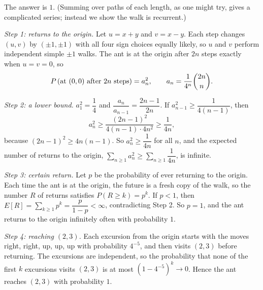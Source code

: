 The answer is $\boxed{1}$. (Summing over paths of each length, as one might try, gives a complicated series; instead we show the walk is recurrent.)

\emph{Step 1: returns to the origin.} Let $u=x+y$ and $v=x-y$. Each step changes $(u,v)$ by $(\pm1,\pm1)$ with all four sign choices equally likely, so $u$ and $v$ perform independent simple $\pm1$ walks. The ant is at the origin after $2n$ steps exactly when $u=v=0$, so
\[P\left(\text{at }(0,0)\text{ after }2n\text{ steps}\right)=a_n^2,\qquad a_n=\dfrac{1}{4^n}\dbinom{2n}{n}.\]

\emph{Step 2: a lower bound.} $a_1^2=\dfrac14$ and $\dfrac{a_n}{a_{n-1}}=\dfrac{2n-1}{2n}$. If $a_{n-1}^2\ge\dfrac{1}{4(n-1)}$, then
\[a_n^2\ge\dfrac{(2n-1)^2}{4(n-1)\cdot4n^2}\ge\dfrac1{4n},\]
because $(2n-1)^2\ge4n(n-1)$. So $a_n^2\ge\dfrac1{4n}$ for all $n$, and the expected number of returns to the origin, $\displaystyle\sum_{n\ge1}a_n^2\ge\sum_{n\ge1}\dfrac{1}{4n}$, is infinite.

\emph{Step 3: certain return.} Let $p$ be the probability of ever returning to the origin. Each time the ant is at the origin, the future is a fresh copy of the walk, so the number $R$ of returns satisfies $P(R\ge k)=p^k$. If $p<1$, then $E[R]=\displaystyle\sum_{k\ge1}p^k=\dfrac{p}{1-p}<\infty$, contradicting Step 2. So $p=1$, and the ant returns to the origin infinitely often with probability $1$.

\emph{Step 4: reaching $(2,3)$.} Each excursion from the origin starts with the moves right, right, up, up, up with probability $4^{-5}$, and then visits $(2,3)$ before returning. The excursions are independent, so the probability that none of the first $k$ excursions visits $(2,3)$ is at most $\left(1-4^{-5}\right)^k\to0$. Hence the ant reaches $(2,3)$ with probability $1$.
